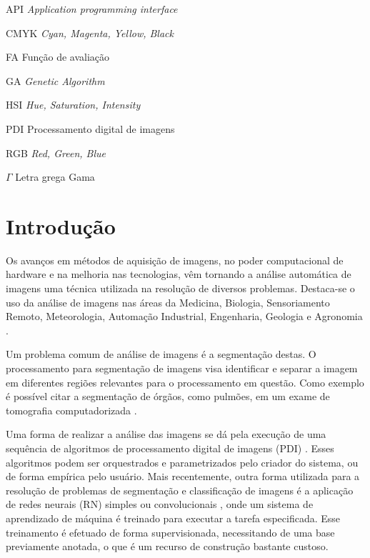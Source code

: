 \documentclass[12pt,oneside,a4paper,english,french,spanish,brazil,]{abntex2}
\begin{document}
\listoffigures*
\cleardoublepage
{}
\listoftables*
\cleardoublepage
\begin{siglas}
  \item[API] \textit{Application programming interface}
  \item[CMYK] \textit{Cyan, Magenta, Yellow, Black}
  \item[FA] Função de avaliação
  \item[GA] \textit{Genetic Algorithm}
  \item[HSI] \textit{Hue, Saturation, Intensity}
  \item[PDI] Processamento digital de imagens
  \item[RGB] \textit{Red, Green, Blue}
\end{siglas}
\begin{simbolos}
  \item[$ \Gamma $] Letra grega Gama
\end{simbolos}
\tableofcontents*
\cleardoublepage
\textual
\chapter{Introdução}
\label{chap:Introducao}

Os avanços em métodos de aquisição de imagens, no poder computacional de hardware e na melhoria nas tecnologias, vêm tornando a análise automática de imagens uma técnica utilizada na resolução de diversos problemas. Destaca-se o uso da análise de imagens nas áreas da Medicina, Biologia, Sensoriamento Remoto, Meteorologia, Automação Industrial, Engenharia, Geologia e Agronomia \cite{queiroz:2007}.  

Um problema comum de análise de imagens é a segmentação destas. O processamento para segmentação de imagens visa identificar e separar a imagem em diferentes regiões relevantes para o processamento em questão. Como exemplo é possível citar a segmentação de órgãos, como pulmões, em um exame de tomografia computadorizada \cite{ronnau:2015}.

Uma forma de realizar a análise das imagens se dá pela execução de uma sequência de algoritmos de processamento digital de imagens (PDI) \cite{gonzalez:2012}. Esses algoritmos podem ser orquestrados e parametrizados pelo criador do sistema, ou de forma empírica pelo usuário. Mais recentemente, outra forma utilizada para a resolução de problemas de segmentação e classificação de imagens é a aplicação de redes neurais (RN) simples ou convolucionais \cite{noh:2015}, onde um sistema de aprendizado de máquina é treinado para executar a tarefa especificada. Esse treinamento é efetuado de forma supervisionada, necessitando de uma base previamente anotada, o que é um recurso de construção bastante custoso.
\end{document}
